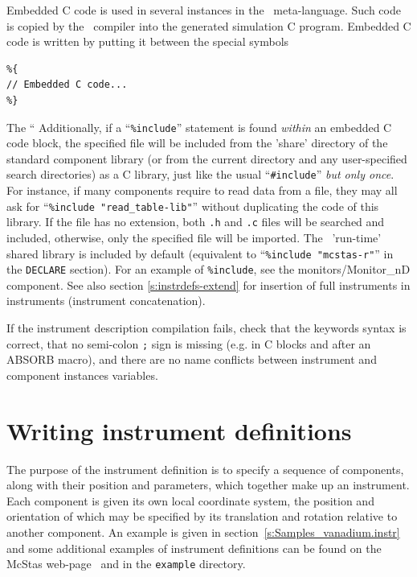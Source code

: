 Embedded C code is used in several instances in the \MCS\
meta-language. Such code is copied by the \MCS\ compiler into the
generated simulation C program. Embedded C code is written by putting it
between the special symbols %
\begin{lstlisting}
%{ 
// Embedded C code...
%}
\end{lstlisting} 
The ``%
Additionally, if a ``\verb+%include+'' statement is found \emph{within} an embedded C code block, the specified file will be included from the 'share' directory of the standard component library  (or from the
current directory and any user-specified search directories) as a C library, just like the usual ``\verb+#include+'' \emph{but only once}. For instance, if many components require to read data from a file, they may all ask for ``\verb+%include "read_table-lib"+''  without duplicating the code of this library. If the file has no extension, both \verb+.h+ and \verb+.c+ files will be searched and included, otherwise, only the specified file will be imported. The \MCS\ 'run-time' shared
library is included by default (equivalent to ``\verb+%include "mcstas-r"+'' in the \texttt{DECLARE} section). \index{Library!Run-time}
For an
example of \texttt{\%include}, see the monitors/Monitor\_nD component. See also section \ref{s:instrdefs-extend} for insertion of full instruments in instruments (instrument concatenation).

If the instrument description compilation fails, check that the
keywords syntax is correct, that no semi-colon \verb+;+ sign is
missing (e.g. in C blocks and after an ABSORB macro), and there are no name conflicts between instrument and component instances variables.


\section{Writing instrument definitions}
\label{s:instrdefs}

The purpose of the instrument definition is to specify a sequence of
components, along with their position and parameters, which together
make up an instrument. Each component is given its own local coordinate
system, the position and orientation of which may be specified by its
translation and rotation relative to another component. An example is
given in section~\ref{s:Samples_vanadium.instr} and some additional
examples of instrument definitions can be found on the McStas
web-page~\cite{mcstas_webpage} and in the \texttt{example} directory.

